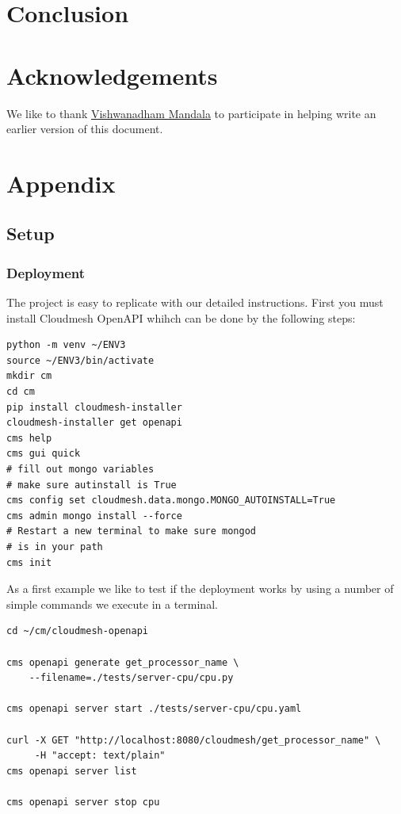 \section{Conclusion}\label{conclusion}



\section*{Acknowledgements}\label{acknowledgements}

We like to thank
\href{https://github.com/cybertraining-dsc/fa20-523-325/}{Vishwanadham
Mandala} to participate in helping write an earlier version of this
document.




\clearpage

\appendix

\section{Appendix}

\subsection{Setup}\label{appendix-a.---setup}

\subsubsection{Deployment}\label{a.1.-deployment}

The project is easy to replicate with our detailed instructions. First
you must install Cloudmesh OpenAPI whihch can be done by the following
steps:


\begin{verbatim}
python -m venv ~/ENV3
source ~/ENV3/bin/activate 
mkdir cm
cd cm
pip install cloudmesh-installer
cloudmesh-installer get openapi 
cms help
cms gui quick
# fill out mongo variables
# make sure autinstall is True
cms config set cloudmesh.data.mongo.MONGO_AUTOINSTALL=True
cms admin mongo install --force
# Restart a new terminal to make sure mongod 
# is in your path
cms init
\end{verbatim}
 

As a first example we like to test if the deployment works by using a
number of simple commands we execute in a terminal.

\begin{verbatim}
cd ~/cm/cloudmesh-openapi

cms openapi generate get_processor_name \
    --filename=./tests/server-cpu/cpu.py

cms openapi server start ./tests/server-cpu/cpu.yaml

curl -X GET "http://localhost:8080/cloudmesh/get_processor_name" \
     -H "accept: text/plain"
cms openapi server list

cms openapi server stop cpu
\end{verbatim}

